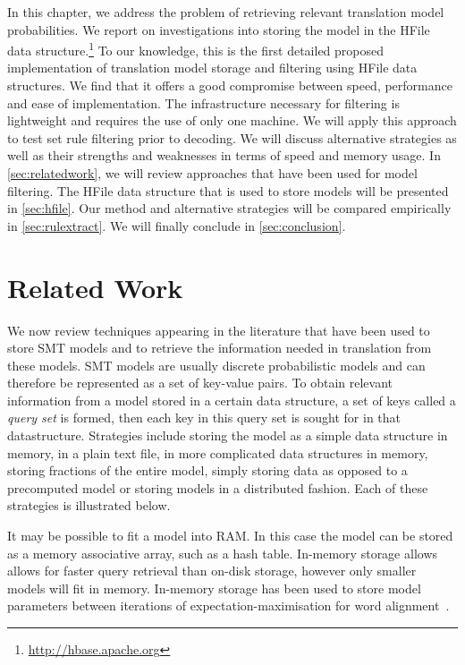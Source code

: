 In this chapter, we address the problem of retrieving relevant translation
model probabilities. We report on investigations into
storing the model in the HFile data
structure.\footnote{\url{http://hbase.apache.org}} To our knowledge, this is the first
detailed proposed implementation of translation model storage and
filtering using HFile data structures. We find that it offers a good compromise
between speed, performance and ease of implementation. The infrastructure necessary
for filtering is lightweight and requires the use of only one machine. We will
apply this approach to test set rule filtering prior
to decoding. We will discuss alternative
strategies as well as their strengths and weaknesses in terms of speed and
memory usage. In \autoref{sec:relatedwork}, we will review approaches that
have been used for model filtering. The HFile data structure that is used to
store models will be presented in \autoref{sec:hfile}. Our method and
alternative strategies will be compared empirically in
\autoref{sec:rulextract}. We will finally conclude in \autoref{sec:conclusion}.

\section{Related Work}
\label{sec:relatedwork}

We now review techniques appearing in the literature that have been used to
store SMT models and to retrieve the information needed in translation from
these models. SMT models are usually discrete probabilistic models and can
therefore be represented as a set of key-value pairs. To obtain relevant
information from a model stored in a certain data structure, a set of keys called a
\emph{query set} is formed, then each key in this query set is sought for in that
datastructure. Strategies include storing the model as a simple data structure in
memory, in a plain text file, in more complicated data structures in memory,
storing fractions of the entire model, simply storing data as opposed to a
precomputed model or storing models in a distributed fashion. Each of these
strategies is illustrated below.

It may be possible to fit a model into RAM. In
this case the model can be stored as a memory associative array, such as a hash
table. In-memory storage allows allows for faster query retrieval than
on-disk storage, however only smaller models will fit in memory.
In-memory storage has been used to store model
parameters between iterations of expectation-maximisation for word
alignment~\citep{dyer-cordova-mont-lin:2008:WMT,lin-dyer:2010:book}.

